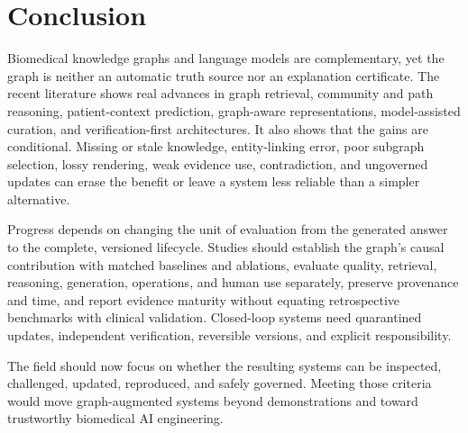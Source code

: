 \section{Conclusion}

Biomedical knowledge graphs and language models are complementary, yet the graph is neither an automatic truth source nor an explanation certificate. The recent literature shows real advances in graph retrieval, community and path reasoning, patient-context prediction, graph-aware representations, model-assisted curation, and verification-first architectures. It also shows that the gains are conditional. Missing or stale knowledge, entity-linking error, poor subgraph selection, lossy rendering, weak evidence use, contradiction, and ungoverned updates can erase the benefit or leave a system less reliable than a simpler alternative.

Progress depends on changing the unit of evaluation from the generated answer to the complete, versioned lifecycle. Studies should establish the graph's causal contribution with matched baselines and ablations, evaluate quality, retrieval, reasoning, generation, operations, and human use separately, preserve provenance and time, and report evidence maturity without equating retrospective benchmarks with clinical validation. Closed-loop systems need quarantined updates, independent verification, reversible versions, and explicit responsibility.

The field should now focus on whether the resulting systems can be inspected, challenged, updated, reproduced, and safely governed. Meeting those criteria would move graph-augmented systems beyond demonstrations and toward trustworthy biomedical AI engineering.
